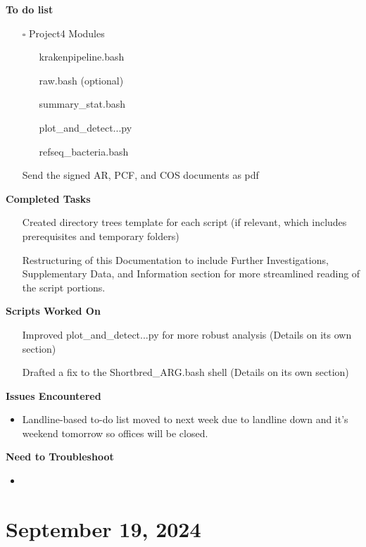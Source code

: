 \documentclass[11pt]{report}
\newcommand{\done}{\checkmark}
\newcommand{\pending}{$\square$}
\begin{document}
{\textbf{To do list}
	\begin{itemize}
		\item [\pending] Project4 Modules
			\begin{itemize}
				\item [\done] krakenpipeline.bash
				\item [\done] raw.bash (optional)
				\item [\done] summary\_stat.bash
				\item [\done] plot\_and\_detect...py
				\item [\done] refseq\_bacteria.bash 
			\end{itemize}
		\item [\done] Send the signed AR, PCF, and COS documents as pdf
	\end{itemize}

\textbf{Completed Tasks} 
\begin{itemize}
	\item [\done] Created directory trees template for each script (if relevant, which includes prerequisites and temporary folders)
	\item [\done] Restructuring of this Documentation to include Further Investigations, Supplementary Data, and Information section for more streamlined reading of the script portions. 
\end{itemize}

\textbf{Scripts Worked On}
\begin{itemize}
	\item [\done] Improved plot\_and\_detect...py for more robust analysis (Details on its own section)
	\item [\done] Drafted a fix to the Shortbred\_ARG.bash shell (Details on its own section)
\end{itemize}


\textbf{Issues Encountered}
\begin{itemize}
	\item Landline-based to-do list moved to next week due to landline down and it's weekend tomorrow so offices will be closed. 
\end{itemize}

\textbf{Need to Troubleshoot}
\begin{itemize}
	\item 
\end{itemize}

\newpage
\section{September 19, 2024}


}
\end{document}
